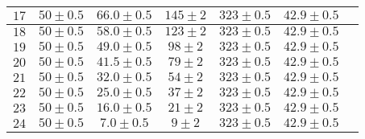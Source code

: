 \begin{tabular}{|c|c|c|c|c|c|c|}
  $17$ & $50 \pm 0.5$ & $66.0 \pm 0.5$ & $145 \pm 2$ & $323 \pm 0.5$ & $42.9 \pm 0.5$ & $ $\\ \hline
  $18$ & $50 \pm 0.5$ & $58.0 \pm 0.5$ & $123 \pm 2$ & $323 \pm 0.5$ & $42.9 \pm 0.5$ & $ $\\ \hline
  $19$ & $50 \pm 0.5$ & $49.0 \pm 0.5$ & $98 \pm 2$ & $323 \pm 0.5$ & $42.9 \pm 0.5$ & $ $\\ \hline
  $20$ & $50 \pm 0.5$ & $41.5 \pm 0.5$ & $79 \pm 2$ & $323 \pm 0.5$ & $42.9 \pm 0.5$ & $ $\\ \hline
  $21$ & $50 \pm 0.5$ & $32.0 \pm 0.5$ & $54 \pm 2$ & $323 \pm 0.5$ & $42.9 \pm 0.5$ & $ $\\ \hline
  $22$ & $50 \pm 0.5$ & $25.0 \pm 0.5$ & $37 \pm 2$ & $323 \pm 0.5$ & $42.9 \pm 0.5$ & $ $\\ \hline
  $23$ & $50 \pm 0.5$ & $16.0 \pm 0.5$ & $21 \pm 2$ & $323 \pm 0.5$ & $42.9 \pm 0.5$ & $ $\\ \hline
  $24$ & $50 \pm 0.5$ & $7.0 \pm 0.5$ & $9 \pm 2$ & $323 \pm 0.5$ & $42.9 \pm 0.5$ & $ $\\ \hline
\end{tabular}